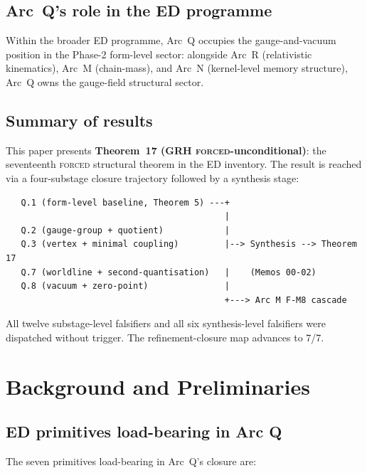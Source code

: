 \documentclass[11pt,a4paper]{article}
\begin{document}
\subsection{Arc~Q's role in the ED programme}

Within the broader ED programme, Arc~Q occupies the gauge-and-vacuum position in the Phase-2 form-level sector: alongside Arc~R (relativistic kinematics), Arc~M (chain-mass), and Arc~N (kernel-level memory structure), Arc~Q owns the gauge-field structural sector.

\subsection{Summary of results}

This paper presents \textbf{Theorem~17 (GRH \textsc{forced}-unconditional)}: the seventeenth \textsc{forced} structural theorem in the ED inventory. The result is reached via a four-substage closure trajectory followed by a synthesis stage:

\begin{verbatim}
   Q.1 (form-level baseline, Theorem 5) ---+
                                           |
   Q.2 (gauge-group + quotient)            |
   Q.3 (vertex + minimal coupling)         |--> Synthesis --> Theorem 17
   Q.7 (worldline + second-quantisation)   |    (Memos 00-02)
   Q.8 (vacuum + zero-point)               |
                                           +---> Arc M F-M8 cascade
\end{verbatim}

All twelve substage-level falsifiers and all six synthesis-level falsifiers were dispatched without trigger. The refinement-closure map advances to 7/7.

\section{Background and Preliminaries}

\subsection{ED primitives load-bearing in Arc Q}

The seven primitives load-bearing in Arc~Q's closure are:
\end{document}
